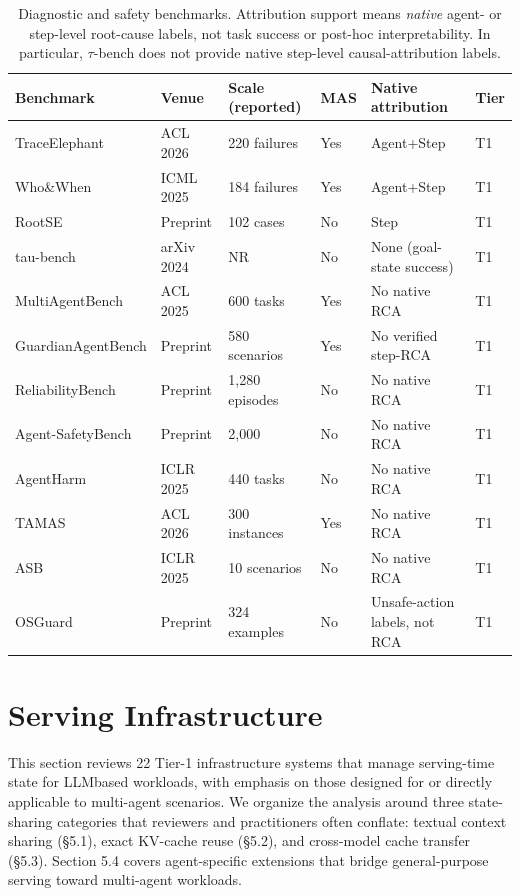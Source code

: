 \documentclass[preprint,12pt]{elsarticle}
\begin{document}

\begin{table}[!tbp]
\centering
\caption{Diagnostic and safety benchmarks. Attribution support means \emph{native} agent- or step-level root-cause labels, not task success or post-hoc interpretability. In particular, $\tau$-bench does not provide native step-level causal-attribution labels.}
\label{tab:v5_3}
\begingroup
\setlength{\tabcolsep}{3pt}
\renewcommand{\arraystretch}{1.16}
\footnotesize
\begin{tabular}{@{}Y{.250\linewidth}Y{.111\linewidth}Y{.154\linewidth}Y{.065\linewidth}Y{.247\linewidth}Y{.057\linewidth}@{}}
\toprule
\textbf{Benchmark} & \textbf{Venue} & \textbf{Scale (reported)} & \textbf{MAS} & \textbf{Native attribution} & \textbf{Tier} \\
\midrule
TraceElephant & ACL 2026 & 220 failures & Yes & Agent+Step & T1 \\
Who\&When & ICML 2025 & 184 failures & Yes & Agent+Step & T1 \\
RootSE & Preprint & 102 cases & No & Step & T1 \\
tau-bench & arXiv 2024 & NR & No & None (goal-state success) & T1 \\
MultiAgentBench \cite{v5supp7} & ACL 2025 & 600 tasks & Yes & No native RCA & T1 \\
GuardianAgent\newline Bench \cite{v5supp8} & Preprint & 580 scenarios & Yes & No verified step-RCA & T1 \\
ReliabilityBench \cite{v5supp9} & Preprint & 1,280 episodes & No & No native RCA & T1 \\
Agent-SafetyBench \cite{v5supp10} & Preprint & 2,000 & No & No native RCA & T1 \\
AgentHarm \cite{v5supp11} & ICLR 2025 & 440 tasks & No & No native RCA & T1 \\
TAMAS \cite{v5supp12} & ACL 2026 & 300 instances & Yes & No native RCA & T1 \\
ASB \cite{v5supp13} & ICLR 2025 & 10 scenarios & No & No native RCA & T1 \\
OSGuard \cite{v5supp14} & Preprint & 324 examples & No & Unsafe-action labels, not RCA & T1 \\
\bottomrule
\end{tabular}
\endgroup
\end{table}
\section{Serving Infrastructure}
This section reviews 22 Tier-1 infrastructure systems that manage serving-time state for LLMbased workloads, with emphasis on those designed for or directly applicable to multi-agent scenarios. We organize the analysis around three state-sharing categories that reviewers and practitioners often conflate: textual context sharing (\S{}5.1), exact KV-cache reuse (\S{}5.2), and cross-model cache transfer (\S{}5.3). Section 5.4 covers agent-specific extensions that bridge general-purpose serving toward multi-agent workloads.
\end{document}
